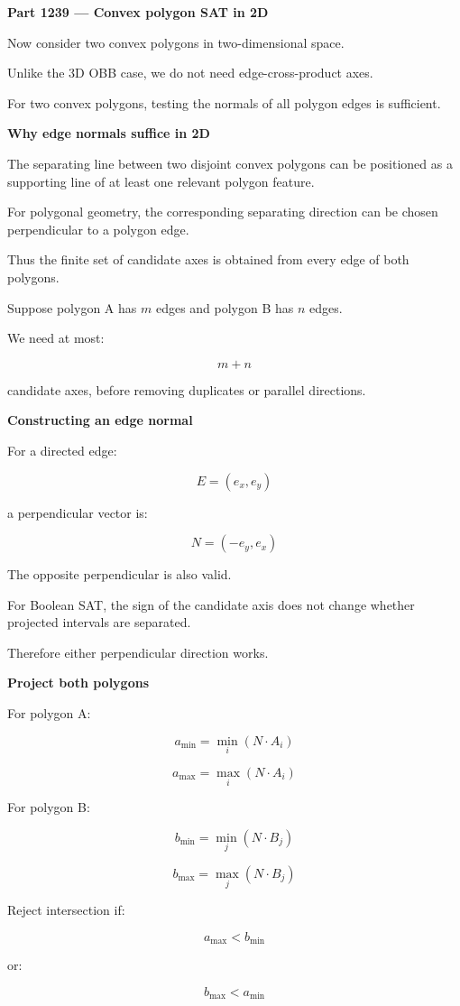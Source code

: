 \textbf{Part 1239 --- Convex polygon SAT in 2D}

Now consider two convex polygons in two-dimensional space.

Unlike the 3D OBB case, we do not need edge-cross-product axes.

For two convex polygons, testing the normals of all polygon edges is sufficient.

\textbf{Why edge normals suffice in 2D}

The separating line between two disjoint convex polygons can be positioned as a supporting line of at least one relevant polygon feature.

For polygonal geometry, the corresponding separating direction can be chosen perpendicular to a polygon edge.

Thus the finite set of candidate axes is obtained from every edge of both polygons.

Suppose polygon A has \(m\) edges and polygon B has \(n\) edges.

We need at most:

\[
\boxed{m+n}
\]

candidate axes, before removing duplicates or parallel directions.

\textbf{Constructing an edge normal}

For a directed edge:

\[
E=(e_x,e_y)
\]

a perpendicular vector is:

\[
\boxed{ N=(-e_y,e_x) }
\]

The opposite perpendicular is also valid.

For Boolean SAT, the sign of the candidate axis does not change whether projected intervals are separated.

Therefore either perpendicular direction works.

\textbf{Project both polygons}

For polygon A:

\[
a_{\min}=\min_i(N\cdot A_i)
\]

\[
a_{\max}=\max_i(N\cdot A_i)
\]

For polygon B:

\[
b_{\min}=\min_j(N\cdot B_j)
\]

\[
b_{\max}=\max_j(N\cdot B_j)
\]

Reject intersection if:

\[
a_{\max}<b_{\min}
\]

or:

\[
b_{\max}<a_{\min}
\]

